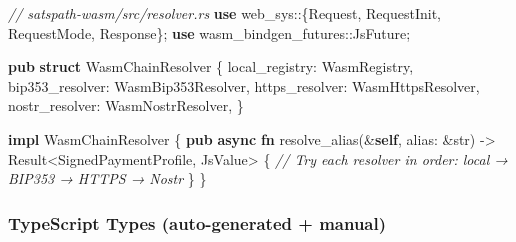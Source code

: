 \documentclass[
]{article}
\newenvironment{Shaded}{}{}
\newcommand{\CommentTok}[1]{\textcolor[rgb]{0.38,0.63,0.69}{\textit{#1}}}
\newcommand{\DataTypeTok}[1]{\textcolor[rgb]{0.56,0.13,0.00}{#1}}
\newcommand{\KeywordTok}[1]{\textcolor[rgb]{0.00,0.44,0.13}{\textbf{#1}}}
\newcommand{\NormalTok}[1]{#1}
\newcommand{\OperatorTok}[1]{\textcolor[rgb]{0.40,0.40,0.40}{#1}}
\newcommand{\PreprocessorTok}[1]{\textcolor[rgb]{0.74,0.48,0.00}{#1}}
\begin{document}
\begin{Shaded}
\begin{Highlighting}[]
\CommentTok{// satspath{-}wasm/src/resolver.rs}
\KeywordTok{use} \PreprocessorTok{web\_sys::}\OperatorTok{\{}\NormalTok{Request}\OperatorTok{,}\NormalTok{ RequestInit}\OperatorTok{,}\NormalTok{ RequestMode}\OperatorTok{,}\NormalTok{ Response}\OperatorTok{\};}
\KeywordTok{use} \PreprocessorTok{wasm\_bindgen\_futures::}\NormalTok{JsFuture}\OperatorTok{;}

\KeywordTok{pub} \KeywordTok{struct}\NormalTok{ WasmChainResolver }\OperatorTok{\{}
\NormalTok{    local\_registry}\OperatorTok{:}\NormalTok{ WasmRegistry}\OperatorTok{,}
\NormalTok{    bip353\_resolver}\OperatorTok{:}\NormalTok{ WasmBip353Resolver}\OperatorTok{,}
\NormalTok{    https\_resolver}\OperatorTok{:}\NormalTok{ WasmHttpsResolver}\OperatorTok{,}
\NormalTok{    nostr\_resolver}\OperatorTok{:}\NormalTok{ WasmNostrResolver}\OperatorTok{,}
\OperatorTok{\}}

\KeywordTok{impl}\NormalTok{ WasmChainResolver }\OperatorTok{\{}
    \KeywordTok{pub} \KeywordTok{async} \KeywordTok{fn}\NormalTok{ resolve\_alias(}\OperatorTok{\&}\KeywordTok{self}\OperatorTok{,}\NormalTok{ alias}\OperatorTok{:} \OperatorTok{\&}\DataTypeTok{str}\NormalTok{) }\OperatorTok{{-}\textgreater{}} \DataTypeTok{Result}\OperatorTok{\textless{}}\NormalTok{SignedPaymentProfile}\OperatorTok{,}\NormalTok{ JsValue}\OperatorTok{\textgreater{}} \OperatorTok{\{}
        \CommentTok{// Try each resolver in order: local → BIP353 → HTTPS → Nostr}
    \OperatorTok{\}}
\OperatorTok{\}}
\end{Highlighting}
\end{Shaded}

\hypertarget{typescript-types-auto-generated-manual}{%
\subsubsection{TypeScript Types (auto-generated +
manual)}\label{typescript-types-auto-generated-manual}}
\end{document}
